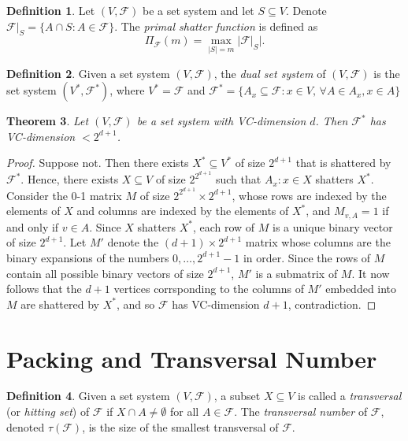 \documentclass[12pt,reqno]{amsart}
\newtheorem{theorem}{Theorem}[section]
\theoremstyle{definition}
\newtheorem{definition}[theorem]{Definition}
\theoremstyle{remark}
\def\F{\mathcal{F}}
\numberwithin{equation}{section}
\begin{document}
\begin{definition}
	Let $(V, \F)$ be a set system and let $S \subseteq V$. Denote $\F|_S = \{A \cap S : A \in \F\}$. The \textit{primal shatter function} is defined as
	\[
		\Pi_\F(m) = \max_{|S| = m} |\F|_S|.
	\]
\end{definition}

\begin{definition}
	Given a set system $(V, \F)$, the \textit{dual set system} of $(V, \F)$ is the set system $(V^*, \F^*)$, where $V^* = \F$ and $\F^* = \{A_x \subseteq \F : x \in V, \, \forall A \in A_x, x \in A\}$
\end{definition}

\begin{theorem}
	Let $(V, \F)$ be a set system with VC-dimension $d$. Then $\F^*$ has VC-dimension $< 2^{d + 1}$.
\end{theorem}

\begin{proof}
	Suppose not. Then there exists $X^* \subseteq V^*$ of size $2^{d + 1}$ that is shattered by $\F^*$. Hence, there exists $X \subseteq V$ of size $2^{2^{d + 1}}$ such that $A_x : x \in X$ shatters $X^*$. Consider the 0-1 matrix $M$ of size $2^{2^{d + 1}} \times 2^{d + 1}$, whose rows are indexed by the elements of $X$ and columns are indexed by the elements of $X^*$, and $M_{v, A} = 1$ if and only if $v  \in A$. Since $X$ shatters $X^*$, each row of $M$ is a unique binary vector of size $2^{d + 1}$. Let $M'$ denote the $(d + 1) \times 2^{d + 1}$ matrix whose columns are the binary expansions of the numbers $0, \ldots, 2^{d + 1} - 1$ in order. Since the rows of $M$ contain all possible binary vectors of size $2^{d + 1}$, $M'$ is a submatrix of $M$. It now follows that the $d + 1$ vertices corrsponding to the columns of $M'$ embedded into $M$ are shattered by $X^*$, and so $\F$ has VC-dimension $d + 1$, contradiction.
\end{proof}

\newpage

\section{Packing and Transversal Number}

\begin{definition}
	Given a set system $(V, \F)$, a subset $X \subseteq V$ is called a \textit{transversal} (or \textit{hitting set}) of $\F$ if $X \cap A \neq \emptyset$ for all $A \in \F$. The \textit{transversal number} of $\F$, denoted $\tau(\F)$, is the size of the smallest transversal of $\F$.
\end{definition}
\end{document}
